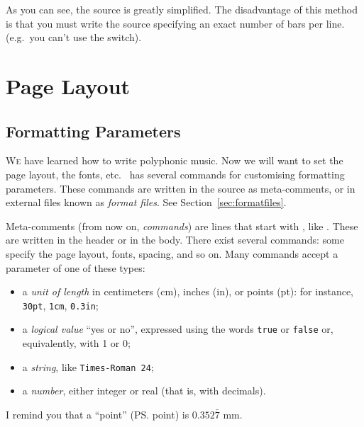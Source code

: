\documentclass[a4paper,12pt]{book}
\begin{document}

As you can see, the source is greatly simplified. The disadvantage of
this method is that you must write the source specifying an exact
number of bars per line. (e.g.\ you can't use the  switch).


\noteseparator


\chapter{Page Layout}

\section{Formatting Parameters}
\label{sec:format}

\lettrine{W}{e} have learned how to write polyphonic music. Now we
will want to set the page layout, the fonts, etc.\ \abcm{} has several
commands for customising formatting parameters. These commands are
written in the source as meta-comments, or in external files known as
\emph{format files}. See Section~\ref{sec:formatfiles}.

Meta-comments (from now on, \emph{commands}) are lines that start with
\metacmd{}, like . These are written in the header or
in the body. There exist several commands: some specify the page
layout, fonts, spacing, and so on. Many commands accept a parameter of
one of these types:

\begin{itemize}
  
  \item a \emph{unit of length} in centimeters (cm), inches (in),
  or points (pt): for instance, \texttt{30pt}, \texttt{1cm},
  \texttt{0.3in};
  
  \item a \emph{logical value} ``yes or no'', expressed using the words
  \texttt{true} or \texttt{false} or, equivalently, with 1 or 0;
  
  \item a \emph{string}, like \texttt{Times-Roman 24};
  
  \item a \emph{number}, either integer or real (that is, with decimals).
  
\end{itemize}

I remind you that a ``point'' (\ps{} point) is $0.352\bar{7}$ mm.
\end{document}
